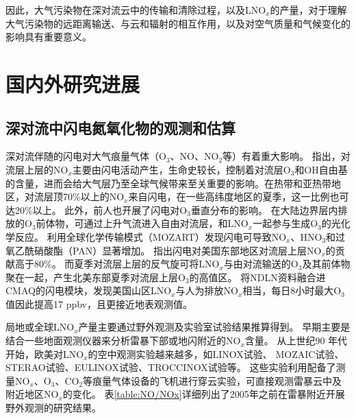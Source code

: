 因此，大气污染物在深对流云中的传输和清除过程，以及LNO$_x$的产量，对于理解大气污染物的远距离输送、与云和辐射的相互作用，以及对空气质量和气候变化的影响具有重要意义。



\section{国内外研究进展}

\subsection{深对流中闪电氮氧化物的观测和估算} \label{sec:intro_lnox}

深对流伴随的闪电对大气痕量气体（O$_3$、NO、NO$_2$等）有着重大影响\citep{DeCaria.2005,Schumann.2007,Ott.2010,Banerjee.2014}。
\citet{Levy.1996}指出，对流层上层的NO$_x$主要由闪电活动产生，生命史较长，控制着对流层O$_3$和OH自由基的含量，进而会给大气层乃至全球气候带来至关重要的影响。在热带和亚热带地区，对流层顶70\%以上的NO$_x$来自闪电，在一些高纬度地区的夏季，这一比例也可达20\%以上\citep{Jourdain.2001,Martin.2002}。
此外，前人也开展了闪电对O$_3$垂直分布的影响。
在大陆边界层内排放的O$_3$前体物，可通过上升气流进入自由对流层，和LNO$_x$一起参与生成O$_3$的光化学反应\citep{Bond.2002}。
\citet{Tie.2001}利用全球化学传输模式（MOZART）发现闪电可导致NO$_x$、HNO$_3$和过氧乙酰硝酸酯（PAN）显著增加。
\citet{Cooper.2009}指出闪电对美国东部地区对流层上层NO$_x$的贡献高于80\%。
而夏季对流层上层的反气旋可将LNO$_x$与由对流输送的O$_3$及其前体物聚在一起，产生北美东部夏季对流层上层O$_3$的高值区。
\citet{Kang.2020}将NDLN资料融合进CMAQ的闪电模块，发现美国山区LNO$_x$与人为排放NO$_x$相当，每日8小时最大O$_3$值因此提高17 ppbv，且更接近地表观测值。

局地或全球LNO$_x$产量主要通过野外观测及实验室试验结果推算得到。
早期主要是结合一些地面观测仪器来分析雷暴下部或地闪附近的NO$_x$含量。
从上世纪90 年代开始，欧美对LNO$_x$的空中观测实验越来越多，如LINOX试验\citep{Huntrieser.1998}、 MOZAIC试验\citep{Marenco.1998}、
STERAO试验\citep{Dye.2000}、EULINOX试验\citep{Holler.2000}、TROCCINOX试验\citep{Huntrieser.2007}等。
这些实验利用配备了测量NO$_x$、O$_3$、CO$_2$等痕量气体设备的飞机进行穿云实验，可直接观测雷暴云中及附近地区NO$_x$的变化。
表\ref{table:NO/NOx}详细列出了2005年之前在雷暴附近开展野外观测的研究结果。

